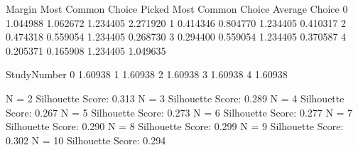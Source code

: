 \documentclass[letterpaper,10pt,english]{jupyterBook}
\begin{document}
\begin{sphinxVerbatim}[commandchars=\\\{\}]
     Margin  Most Common Choice Picked  Most Common Choice  Average Choice  \PYGZbs{}
0  1.044988                   1.062672            1.234405        2.271920   
1 \PYGZhy{}0.414346                  \PYGZhy{}0.804770            1.234405       \PYGZhy{}0.410317   
2 \PYGZhy{}0.474318                  \PYGZhy{}0.559054            1.234405        0.268730   
3 \PYGZhy{}0.294400                  \PYGZhy{}0.559054            1.234405        0.370587   
4  0.205371                  \PYGZhy{}0.165908            1.234405        1.049635   

   StudyNumber  
0     \PYGZhy{}1.60938  
1     \PYGZhy{}1.60938  
2     \PYGZhy{}1.60938  
3     \PYGZhy{}1.60938  
4     \PYGZhy{}1.60938  
\end{sphinxVerbatim}

\begin{sphinxVerbatim}[commandchars=\\\{\}]
    
      
        
          
\end{sphinxVerbatim}

\begin{sphinxVerbatim}[commandchars=\\\{\}]
N = 2 Silhouette Score: 0.313
N = 3 Silhouette Score: 0.289
N = 4 Silhouette Score: 0.267
N = 5 Silhouette Score: 0.273
N = 6 Silhouette Score: 0.277
N = 7 Silhouette Score: 0.290
N = 8 Silhouette Score: 0.299
N = 9 Silhouette Score: 0.302
N = 10 Silhouette Score: 0.294
\end{sphinxVerbatim}
\end{document}
